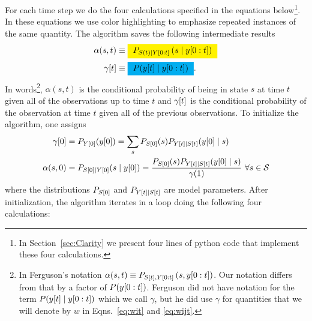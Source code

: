 For each time step we do the four calculations specified in the
equations below\footnote{In Section~\ref{sec:Clarity} we present four
  lines of python code that implement these four calculations.}.  In
these equations we use color highlighting to emphasize repeated
instances of the same quantity.  The algorithm saves the following
intermediate results
%
%
\begin{align}
  \label{eq:alpha}
  \alpha(s,t) &\equiv \alphax{t}{s}\\
  \label{eq:gamma}
  \ti{\gamma}{t} &\equiv \gammax .
\end{align}
In words\footnote{In Ferguson's notation $\alpha(s,t) \equiv
  P_{{S}{[t]},Y[0:t]} \left(s,y[0:t] \right)$.  Our
  notation differs from that by a factor of $P(y[0:t])$.
  Ferguson did not have notation for the term
  $P({y}{[t]}\mid y[0:t])$ which we call $\gamma$, but he did use
  $\gamma$ for quantities that we will denote by $w$ in
  Eqns.~\eqref{eq:wit} and \eqref{eq:wijt}.}, $\alpha(s,t)$ is the
conditional probability of being in state $s$ at time $t$ given all
of the observations up to time $t$ and ${\gamma}{[t]}$ is the
conditional probability of the observation at time $t$ given all of
the previous observations.  To initialize the algorithm, one assigns
\begin{align*}
  \ti{\gamma}{0} &= P_{\ti{Y}{0}}(\ti{y}{0}) =
              \sum_{s}P_{\ti{S}{0}}(s)P_{\ti{Y}{t}\given \ti{S}{t}}(\ti{y}{0}\given s)
  \\
  \alpha(s,0) &= P_{\ti{S}{0}\given \ti{Y}{0}}(s\given \ti{y}{0}) =
  \frac{P_{\ti{S}{0}}(s)P_{\ti{Y}{t}\given \ti{S}{t}}(\ti{y}{0}\given s)}
  {\gamma(1)}
~\forall s \in \states
\end{align*}
where the distributions $P_{{S}{[0]}}$ and $P_{{Y}{[t]}\mid {S}{[t]}}$
are model parameters.  After initialization, the algorithm iterates in
a loop doing the following four calculations: 

